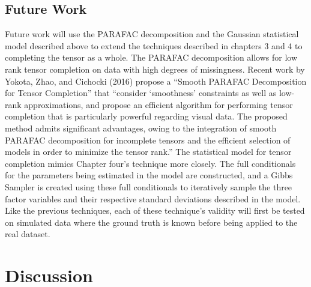 \documentclass[12pt,twoside]{dukestatscithesis}
\theoremstyle{definition}
\theoremstyle{definition}
\theoremstyle{definition}
\theoremstyle{remark}
\begin{document}
\section{Future Work}\label{future-work}

Future work will use the PARAFAC decomposition and the Gaussian
statistical model described above to extend the techniques described in
chapters 3 and 4 to completing the tensor as a whole. The PARAFAC
decomposition allows for low rank tensor completion on data with high
degrees of missingness. Recent work by Yokota, Zhao, and Cichocki (2016)
propose a ``Smooth PARAFAC Decomposition for Tensor Completion'' that
``consider `smoothness' constraints as well as low-rank approximations,
and propose an efficient algorithm for performing tensor completion that
is particularly powerful regarding visual data. The proposed method
admits significant advantages, owing to the integration of smooth
PARAFAC decomposition for incomplete tensors and the efficient selection
of models in order to minimize the tensor rank.'' The statistical model
for tensor completion mimics Chapter four's technique more closely. The
full conditionals for the parameters being estimated in the model are
constructed, and a Gibbs Sampler is created using these full
conditionals to iteratively sample the three factor variables and their
respective standard deviations described in the model. Like the previous
techniques, each of these technique's validity will first be tested on
simulated data where the ground truth is known before being applied to
the real dataset.

\chapter*{Discussion}\label{discussion}
\end{document}
